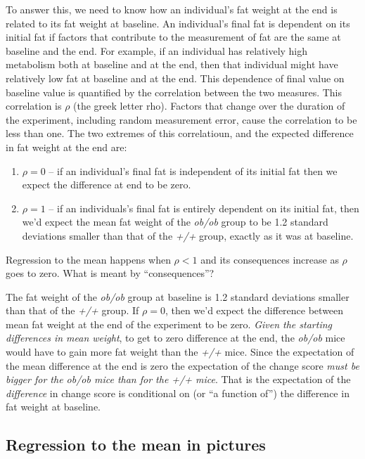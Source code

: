 \documentclass[]{book}
\providecommand{\tightlist}{%
  \setlength{\itemsep}{0pt}\setlength{\parskip}{0pt}}
\begin{document}
To answer this, we need to know how an individual's fat weight at the end is related to its fat weight at baseline. An individual's final fat is dependent on its initial fat if factors that contribute to the measurement of fat are the same at baseline and the end. For example, if an individual has relatively high metabolism both at baseline and at the end, then that individual might have relatively low fat at baseline and at the end. This dependence of final value on baseline value is quantified by the correlation between the two measures. This correlation is \(\rho\) (the greek letter rho). Factors that change over the duration of the experiment, including random measurement error, cause the correlation to be less than one. The two extremes of this correlatioun, and the expected difference in fat weight at the end are:

\begin{enumerate}
\def\labelenumi{\arabic{enumi}.}
\tightlist
\item
  \(\rho=0\) -- if an individual's final fat is independent of its initial fat then we expect the difference at end to be zero.
\item
  \(\rho=1\) -- if an individuals's final fat is entirely dependent on its initial fat, then we'd expect the mean fat weight of the \emph{ob/ob} group to be 1.2 standard deviations smaller than that of the \emph{+/+} group, exactly as it was at baseline.
\end{enumerate}

Regression to the mean happens when \(\rho < 1\) and its consequences increase as \(\rho\) goes to zero. What is meant by ``consequences''?

The fat weight of the \emph{ob/ob} group at baseline is 1.2 standard deviations smaller than that of the \emph{+/+} group. If \(\rho=0\), then we'd expect the difference between mean fat weight at the end of the experiment to be zero. \emph{Given the starting differences in mean weight}, to get to zero difference at the end, the \emph{ob/ob} mice would have to gain more fat weight than the \emph{+/+} mice. Since the expectation of the mean difference at the end is zero the expectation of the change score \emph{must be bigger for the ob/ob mice than for the +/+ mice}. That is the expectation of the \emph{difference} in change score is conditional on (or ``a function of'') the difference in fat weight at baseline.

\hypertarget{regression-to-the-mean-in-pictures}{%
\subsection{Regression to the mean in pictures}\label{regression-to-the-mean-in-pictures}}
\end{document}
